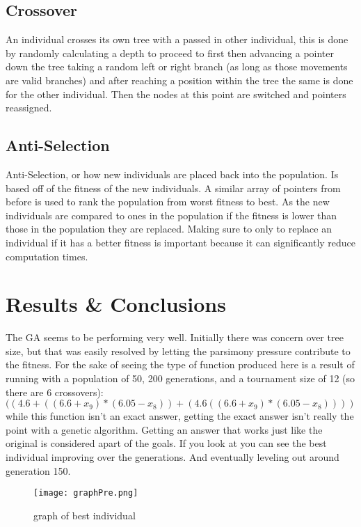 \documentclass[twoside]{article}
\begin{document}
\begin{multicols}{2}
\subsection{Crossover}
An individual crosses its own tree with a passed in other individual, this is done by randomly calculating a depth to proceed to first then advancing a pointer down the tree taking a random left or right branch (as long as those movements are valid branches) and after reaching a position within the tree the same is done for the other individual. Then the nodes at this point are switched and pointers reassigned.

\subsection{Anti-Selection}
Anti-Selection, or how new individuals are placed back into the population. Is based off of the fitness of the new individuals. A similar array of pointers from before is used to rank the population from worst fitness to best. As the new individuals are compared to ones in the population if the fitness is lower than those in the population they are replaced. Making sure to only to replace an individual if it has a better fitness is important because it can significantly reduce computation times.

\section{Results \& Conclusions}
The GA seems to be performing very well. Initially there was concern over tree size, but that was easily resolved by letting the parsimony pressure contribute to the fitness. For the sake of seeing the type of function produced here is a result of running with a population of 50, 200 generations, and a tournament size of 12 (so there are 6 crossovers): $((4.6+((6.6+x_9)*(6.05-x_8))+(4.6((6.6+x_9)*(6.05-x_8))))$ while this function isn't an exact answer, getting the exact answer isn't really the point with a genetic algorithm. Getting an answer that works just like the original is considered apart of the goals. If you look at you can see the best individual improving over the generations. And eventually leveling out around generation 150.

\begin{figure}[H]
		\label{fig:Best}
		\texttt{[image: graphPre.png]}
		\caption{graph of best individual}
\end{figure}


\end{multicols}
\end{document}
